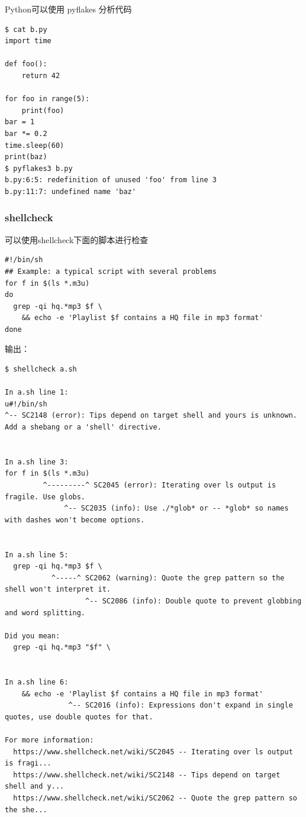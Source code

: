 \documentclass[a4paper,12pt]{ctexart}
\begin{document}
Python可以使用 pyflakes 分析代码

\begin{lstlisting}
$ cat b.py
import time

def foo():
    return 42

for foo in range(5):
    print(foo)
bar = 1
bar *= 0.2
time.sleep(60)
print(baz)
$ pyflakes3 b.py
b.py:6:5: redefinition of unused 'foo' from line 3
b.py:11:7: undefined name 'baz'
\end{lstlisting}

\subsubsection{shellcheck}

可以使用shellcheck下面的脚本进行检查

\begin{lstlisting}
#!/bin/sh
## Example: a typical script with several problems
for f in $(ls *.m3u)
do
  grep -qi hq.*mp3 $f \
    && echo -e 'Playlist $f contains a HQ file in mp3 format'
done
\end{lstlisting}

输出：
\begin{lstlisting}
$ shellcheck a.sh

In a.sh line 1:
u#!/bin/sh
^-- SC2148 (error): Tips depend on target shell and yours is unknown. Add a shebang or a 'shell' directive.


In a.sh line 3:
for f in $(ls *.m3u)
         ^---------^ SC2045 (error): Iterating over ls output is fragile. Use globs.
              ^-- SC2035 (info): Use ./*glob* or -- *glob* so names with dashes won't become options.


In a.sh line 5:
  grep -qi hq.*mp3 $f \
           ^-----^ SC2062 (warning): Quote the grep pattern so the shell won't interpret it.
                   ^-- SC2086 (info): Double quote to prevent globbing and word splitting.

Did you mean:
  grep -qi hq.*mp3 "$f" \


In a.sh line 6:
    && echo -e 'Playlist $f contains a HQ file in mp3 format'
               ^-- SC2016 (info): Expressions don't expand in single quotes, use double quotes for that.

For more information:
  https://www.shellcheck.net/wiki/SC2045 -- Iterating over ls output is fragi...
  https://www.shellcheck.net/wiki/SC2148 -- Tips depend on target shell and y...
  https://www.shellcheck.net/wiki/SC2062 -- Quote the grep pattern so the she...
\end{lstlisting}
\end{document}
